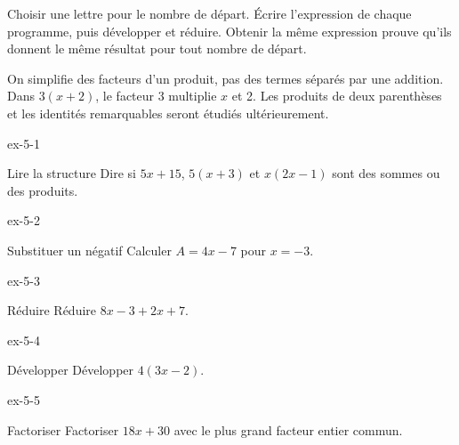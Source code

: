 \begin{savoirfaire}Choisir une lettre pour le nombre de départ. Écrire l’expression de chaque programme, puis développer et réduire. Obtenir la même expression prouve qu’ils donnent le même résultat pour tout nombre de départ.\end{savoirfaire}
\begin{attention}On simplifie des facteurs d’un produit, pas des termes séparés par une addition. Dans $3(x+2)$, le facteur 3 multiplie $x$ et 2. Les produits de deux parenthèses et les identités remarquables seront étudiés ultérieurement.\end{attention}

\clearpage{}
\begin{blocLivre}{ex-5-1}\begin{exercice}[1]{Lire la structure}
Dire si $5x+15$, $5(x+3)$ et $x(2x-1)$ sont des sommes ou des produits.
\end{exercice}\end{blocLivre}
\begin{blocLivre}{ex-5-2}\begin{exercice}[1]{Substituer un négatif}
Calculer $A=4x-7$ pour $x=-3$.
\end{exercice}\end{blocLivre}
\begin{blocLivre}{ex-5-3}\begin{exercice}[1]{Réduire}
Réduire $8x-3+2x+7$.
\end{exercice}\end{blocLivre}
\begin{blocLivre}{ex-5-4}\begin{exercice}[1]{Développer}
Développer $4(3x-2)$.
\end{exercice}\end{blocLivre}
\begin{blocLivre}{ex-5-5}\begin{exercice}[1]{Factoriser}
Factoriser $18x+30$ avec le plus grand facteur entier commun.
\end{exercice}\end{blocLivre}

